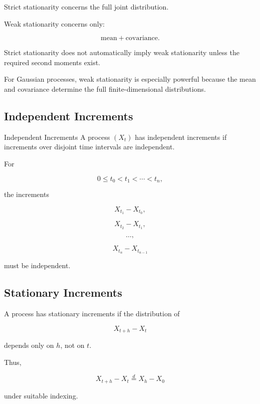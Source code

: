 Strict stationarity concerns the full joint distribution.

Weak stationarity concerns only:

\[
\boxed{
\text{mean}
+
\text{covariance}.
}
\]

Strict stationarity does not automatically imply weak stationarity
unless the required second moments exist.

For Gaussian processes, weak stationarity is especially powerful
because the mean and covariance determine the full finite-dimensional
distributions.

\subsection{Independent Increments}
\label{subsec:independent-increments}

\begin{definitionbox}{Independent Increments}
A process \((X_t)\) has independent increments if increments over
disjoint time intervals are independent.
\end{definitionbox}

For

\[
0\leq t_0<t_1<\cdots<t_n,
\]

the increments

\[
X_{t_1}-X_{t_0},
\]

\[
X_{t_2}-X_{t_1},
\]

\[
\ldots,
\]

\[
X_{t_n}-X_{t_{n-1}}
\]

must be independent.

\subsection{Stationary Increments}
\label{subsec:stationary-increments}

A process has stationary increments if the distribution of

\[
X_{t+h}-X_t
\]

depends only on \(h\), not on \(t\).

Thus,

\[
\boxed{
X_{t+h}-X_t
\overset{d}{=}
X_h-X_0
}
\]

under suitable indexing.

